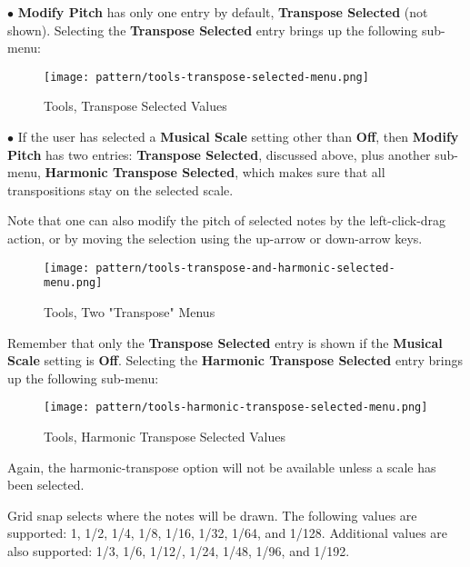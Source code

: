    $\bullet$ \textbf{Modify Pitch} has only one entry by default,
   \textbf{Transpose Selected} (not shown).
   Selecting the \textbf{Transpose Selected} entry
   brings up the following sub-menu:

\begin{figure}[H]
   \centering 
   \texttt{[image: pattern/tools-transpose-selected-menu.png]}
   \caption{Tools, Transpose Selected Values}
   \label{fig:pattern_editor_tools_transpose_selected_menu}
\end{figure}

   $\bullet$ If the user has selected a
   \textbf{Musical Scale} setting other than \textbf{Off},
   then \textbf{Modify Pitch} has two entries:
   \textbf{Transpose Selected}, discussed above, plus
   another sub-menu,
   \textbf{Harmonic Transpose Selected}, which makes sure that all
   transpositions stay on the selected scale.

   Note that one can also modify the pitch of selected notes by the
   left-click-drag action, or by moving the selection using the
   up-arrow or down-arrow keys.

\begin{figure}[H]
   \centering 
   \texttt{[image: pattern/tools-transpose-and-harmonic-selected-menu.png]}
   \caption{Tools, Two "Transpose" Menus}
   \label{fig:pattern_editor_tools_two_transpose_menus}
\end{figure}

   Remember that only the \textbf{Transpose Selected} entry is shown if the
   \textbf{Musical Scale} setting is \textbf{Off}.
   Selecting the \textbf{Harmonic Transpose Selected} entry brings up the
   following sub-menu:

\begin{figure}[H]
   \centering 
   \texttt{[image: pattern/tools-harmonic-transpose-selected-menu.png]}
   \caption{Tools, Harmonic Transpose Selected Values}
   \label{fig:pattern_editor_tools_harmonic_transpose_menu}
\end{figure}

   Again, the harmonic-transpose option will not be available unless a scale
   has been selected.

   Grid snap selects where the notes will be drawn.
   The following values are supported:
   1, 1/2, 1/4, 1/8, 1/16, 1/32, 1/64, and 1/128.
   Additional values are also supported:
   1/3, 1/6, 1/12/, 1/24, 1/48, 1/96, and 1/192.

